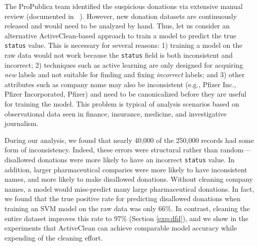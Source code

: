 
The ProPublica team identified the suspicious donations via extensive manual review (documented in ~\cite{dollarsfordocs}).
However, new donation datasets are continuously released and would need to be analyzed by hand.
Thus, let us consider an alternative ActiveClean-based approach to train a model to predict the true \texttt{status} value.
This is necessary for several reasons: 1) training a model on the raw data would not work because the \texttt{status} field is both inconsistent and incorrect;
2) techniques such as active learning are only designed for acquiring {\it new} labels and not suitable for finding and fixing {\it incorrect} labels;
and 3) other attributes such as company name may also be inconsistent (e.g., Pfizer Inc., Pfizer Incorporated, Pfizer) and need to be canonicalized before they are useful
for training the model.
This problem is typical of analysis scenarios based on observational data seen in finance, insurance, medicine, and investigative journalism.

During our analysis, we found that nearly 40,000 of the 250,000 records had some form of inconsistency.
Indeed, these errors were structural rather than random---disallowed donations were more likely to have an incorrect \texttt{status} value.
In addition, larger pharmaceutical comparies were more likely to have inconsistent names, and more likely to make disallowed donations.
Without cleaning company names, a model would miss-predict many large pharmaceutical donations.
In fact, we found that the true positive rate for predicting disallowed donations when training an SVM model on the raw data was only 66\%.
In contrast, cleaning the entire dataset improves this rate to 97\% (Section \ref{exp:dfd}), and we show in the experiments that ActiveClean
can achieve comparable model accuracy while expending  of the cleaning effort.



